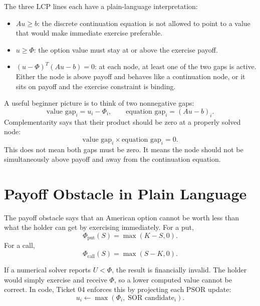 \documentclass[11pt,a4paper]{article}
\begin{document}
The three LCP lines each have a plain-language interpretation:
\begin{itemize}
  \item \(A u \geq b\): the discrete continuation equation is not allowed to point to a value
        that would make immediate exercise preferable.
  \item \(u \geq \Phi\): the option value must stay at or above the exercise payoff.
  \item \((u-\Phi)^T(Au-b)=0\): at each node, at least one of the two gaps is active. Either the
        node is above payoff and behaves like a continuation node, or it sits on payoff and the
        exercise constraint is binding.
\end{itemize}

A useful beginner picture is to think of two nonnegative gaps:
\begin{equation}
  \text{value gap}_i = u_i-\Phi_i,
  \qquad
  \text{equation gap}_i = (Au-b)_i.
\end{equation}
Complementarity says that their product should be zero at a properly solved node:
\begin{equation}
  \text{value gap}_i \times \text{equation gap}_i = 0.
\end{equation}
This does not mean both gaps must be zero. It means the node should not be simultaneously above
payoff and away from the continuation equation.

\section{Payoff Obstacle in Plain Language}

The payoff obstacle says that an American option cannot be worth less than what the holder can get
by exercising immediately. For a put,
\begin{equation}
  \Phi_{\mathrm{put}}(S)=\max(K-S,0).
\end{equation}
For a call,
\begin{equation}
  \Phi_{\mathrm{call}}(S)=\max(S-K,0).
\end{equation}

If a numerical solver reports \(U<\Phi\), the result is financially invalid. The holder would
simply exercise and receive \(\Phi\), so a lower computed value cannot be correct. In code,
Ticket 04 enforces this by projecting each PSOR update:
\begin{equation}
  u_i \leftarrow \max(\Phi_i,\; \text{SOR candidate}_i).
\end{equation}
\end{document}
